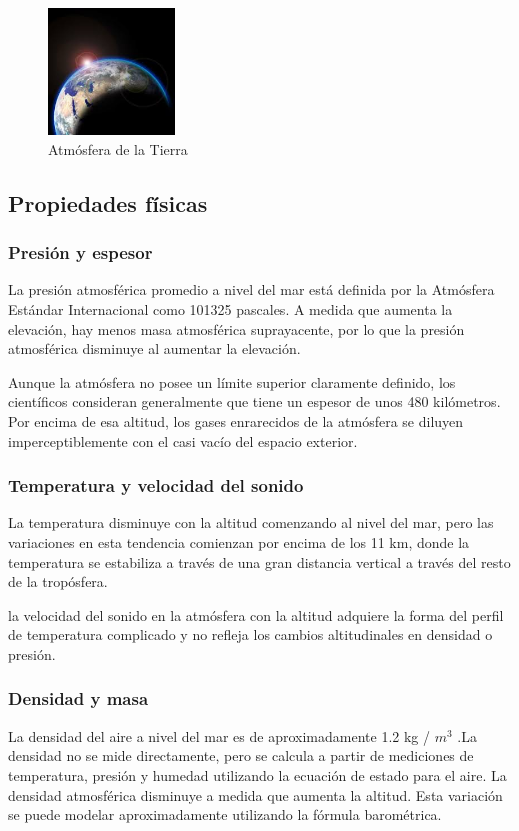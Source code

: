 \documentclass{article} %
\begin{document}
\begin{figure}
  \centering
  \includegraphics[width=0.3\textwidth]{Atmosfera.jpg}
  \caption{Atmósfera de la Tierra}
  \label{fig:atmósfera}
\end{figure}

\subsection{Propiedades físicas}

\subsubsection {Presión y espesor}
La presión atmosférica promedio a nivel del mar está definida por la Atmósfera Estándar Internacional como 101325 pascales. A medida que aumenta la elevación, hay menos masa atmosférica suprayacente, por lo que la presión atmosférica disminuye al aumentar la elevación.
 
Aunque la atmósfera no posee un límite superior claramente definido, los científicos consideran generalmente que tiene un espesor de unos 480 kilómetros. Por encima de esa altitud, los gases enrarecidos de la atmósfera se diluyen imperceptiblemente con el casi vacío del espacio exterior.

\subsubsection {Temperatura y velocidad del sonido}
La temperatura disminuye con la altitud comenzando al nivel del mar, pero las variaciones en esta tendencia comienzan por encima de los 11 km, donde la temperatura se estabiliza a través de una gran distancia vertical a través del resto de la tropósfera.

la velocidad del sonido en la atmósfera con la altitud adquiere la forma del perfil de temperatura complicado y no refleja los cambios altitudinales en densidad o presión.


\subsubsection {Densidad y masa}
La densidad del aire a nivel del mar es de aproximadamente 1.2 kg / $m^{3}$ .La densidad no se mide directamente, pero se calcula a partir de mediciones de temperatura, presión y humedad utilizando la ecuación de estado para el aire. La densidad atmosférica disminuye a medida que aumenta la altitud. Esta variación se puede modelar aproximadamente utilizando la fórmula barométrica.
\end{document}
